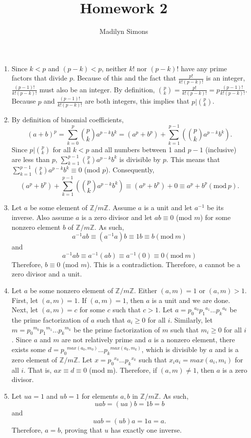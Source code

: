 \documentclass{article}
\title{Homework 2}
\author{Madilyn Simons}
\date{}
\begin{document}
\maketitle

\begin{enumerate}

\item Since $k < p$ and $(p-k) < p$, neither $k!$ nor $(p-k)!$ have any prime factors that divide $p$.
Because of this and the fact that $\frac{p!}{k!(p-k)!}$ is an integer,
$\frac{(p-1)!}{k!(p-k)!}$ must also be an integer.
By definition, $\binom{p}{k} = \frac{p!}{k!(p-k)!} = p\frac{(p-1)!}{k!(p-k)!}$.
Because $p$ and $\frac{(p-1)!}{k!(p-k)!}$ are both integers, this implies that $p \vert \binom{p}{k}$.

\item By definition of binomial coefficients,
\[
(a+b)^p = \sum_{k=0}^{p} \binom{p}{k} a^{p-k}b^k = (a^p + b^p) +
\sum_{k=1}^{p-1} (\binom{p}{k} a^{p-k}b^k).
\]
Since $p \vert \binom{p}{k}$ for all $k < p$ and all numbers between 1 and $p-1$
(inclusive) are less than $p$, $\sum_{k=1}^{p-1} \binom{p}{k} a^{p-k}b^k$ is divisible
by $p$.  This means that $\sum_{k=1}^{p-1} \binom{p}{k} a^{p-k}b^k \equiv 0$ (mod $p$).
Consequently,
\[
(a^p + b^p) + \sum_{k=1}^{p-1} (\binom{p}{k} a^{p-k}b^k) \equiv (a^p + b^p) + 0
\equiv a^p + b ^p (\textrm{mod}\ p).
\]

\item Let $a$ be some element of $\mathbb{Z}/m\mathbb{Z}$.  Assume $a$ is a unit
and let $a^{-1}$ be its inverse.  Also assume $a$ is a zero divisor and let
$ab \equiv 0$ (mod $m$) for some nonzero element $b$ of $\mathbb{Z}/m\mathbb{Z}$.
As such,
\[
a^{-1}ab \equiv (a^{-1}a)b \equiv 1b \equiv b (\textrm{mod}\ m)
\]
and
\[
a^{-1}ab \equiv a^{-1}(ab) \equiv a^{-1}(0) \equiv 0 (\textrm{mod}\ m)
\]
Therefore, $b \equiv 0$ (mod $m$).  This is a contradiction.  Therefore, $a$ cannot
be a zero divisor and a unit.

\item Let $a$ be some nonzero element of $\mathbb{Z}/m\mathbb{Z}$.  Either $(a,m) = 1$
or $(a,m) > 1$.  First, let $(a,m) = 1$.  If $(a,m) = 1$, then $a$ is a unit
and we are done.  Next, let $(a, m) = c$ for some $c$ such that $c > 1$.
Let $a = {p_0}^{a_0}{p_1}^{a_1} ... {p_k}^{a_k}$ be the prime factorization of
$a$ such that $a_i \geq 0$ for all $i$.
Similarly, let $m = {p_0}^{m_0}{p_1}^{m_1} ... {p_k}^{m_k}$ be the prime factorization of
$m$ such that $m_i \geq 0$ for all $i$.
Since $a$ and $m$ are not relatively prime and $a$ is a nonzero element, there exists
some $d = {p_0}^{max(a_0, m_0)} ... {p_k}^{max(a_k, m_k)}$, which is divisible by $a$
and is a zero element of $\mathbb{Z}/m\mathbb{Z}$.
Let $x = {p_0}^{x_0} ... {p_k}^{x_k}$ such that ${x_i}{a_i} = max(a_i, m_i)$
for all $i$.  That is, $ax \equiv d \equiv 0$ (mod m).
Therefore, if $(a, m) \neq 1$, then $a$ is a zero divisor.

\item Let $ua = 1$ and $ub = 1$ for elements $a, b$ in $\mathbb{Z}/m\mathbb{Z}$.
As such,
\[
uab = (ua)b = 1b = b
\]
and
\[
uab = (ub)a = 1a = a.
\]
Therefore, $a = b$, proving that $u$ has exactly one inverse.

\end{enumerate}
\end{document}
